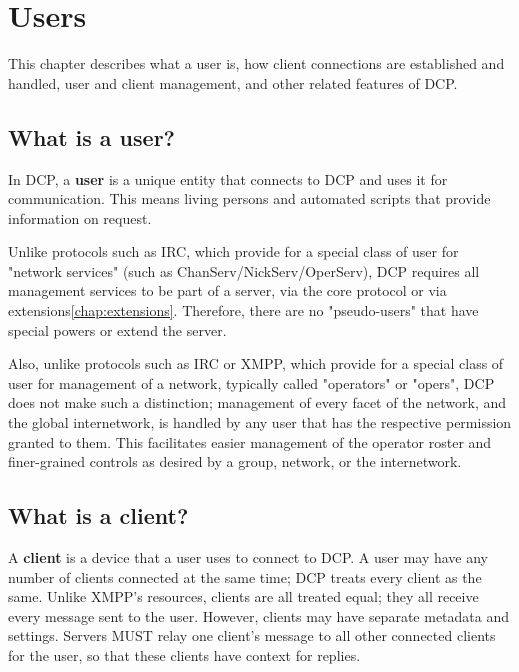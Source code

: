 \chapter{Users}
\label{chap:users}

This chapter describes what a user is, how client connections are established
and handled, user and client management, and other related features of DCP.

\newpage



\section{What is a user?}
\sectionrule

In DCP, a \textbf{user} is a unique entity that connects to DCP and uses it for
communication.  This means living persons and automated scripts that provide
information on request.

Unlike protocols such as IRC\cite{rfc1459}, which provide for a special class of
user for "network services" (such as ChanServ/NickServ/OperServ), DCP requires
all management services to be part of a server, via the core protocol or via
extensions\ref{chap:extensions}.  Therefore, there are no "pseudo-users" that
have special powers or extend the server.

Also, unlike protocols such as IRC or XMPP\cite{xmpp}, which provide for a
special class of user for management of a network, typically called "operators"
or "opers", DCP does not make such a distinction; management of every facet of
the network, and the global internetwork, is handled by any user that has the
respective permission granted to them.  This facilitates easier management of
the operator roster and finer-grained controls as desired by a group, network,
or the internetwork.



\section{What is a client?}
\sectionrule

A \textbf{client} is a device that a user uses to connect to DCP.  A user may
have any number of clients connected at the same time; DCP treats every client
as the same.  Unlike XMPP's resources, clients are all treated equal; they all
receive every message sent to the user.  However, clients may have separate
metadata and settings.  Servers MUST relay one client's message to all other
connected clients for the user, so that these clients have context for replies.

